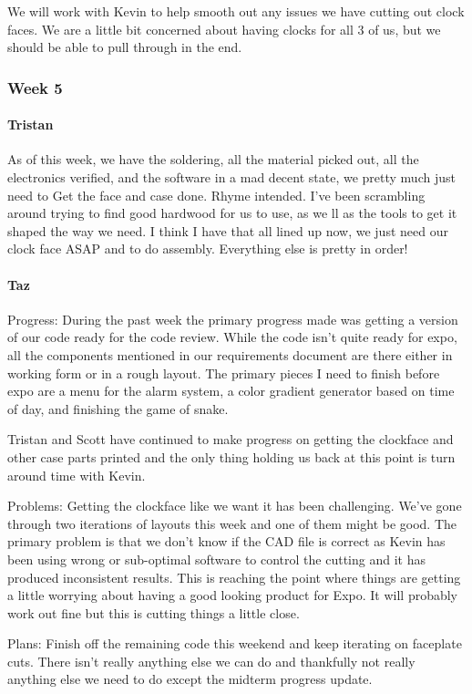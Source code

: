 \documentclass[onecolumn, draftclsnofoot,10pt, compsoc]{IEEEtran}
\begin{document}
We will work with Kevin to help smooth out any issues we have cutting out clock faces. We are a little bit concerned about having clocks for all 3 of us, but we should be able to pull through in the end.
\subsubsection{Week 5}
\paragraph{Tristan}
As of this week, we have the soldering, all the material picked out, all the electronics verified, and the software in a mad decent state, we pretty much just need to Get the face and case done. Rhyme intended. I've been scrambling around trying to find good hardwood for us to use, as we ll as the tools to get it shaped the way we need. I think I have that all lined up now, we just need our clock face ASAP and to do assembly. Everything else is pretty in order!

\paragraph{Taz}
Progress: During the past week the primary progress made was getting a version of our code ready for the code review. While the code isn't quite ready for expo, all the components mentioned in our requirements document are there either in working form or in a rough layout. The primary pieces I need to finish before expo are a menu for the alarm system, a color gradient generator based on time of day, and finishing the game of snake.

Tristan and Scott have continued to make progress on getting the clockface and other case parts printed and the only thing holding us back at this point is turn around time with Kevin.

Problems: Getting the clockface like we want it has been challenging. We've gone through two iterations of layouts this week and one of them might be good. The primary problem is that we don't know if the CAD file is correct as Kevin has been using wrong or sub-optimal software to control the cutting and it has produced inconsistent results. This is reaching the point where things are getting a little worrying about having a good looking product for Expo. It will probably work out fine but this is cutting things a little close.

Plans: Finish off the remaining code this weekend and keep iterating on faceplate cuts. There isn't really anything else we can do and thankfully not really anything else we need to do except the midterm progress update.
\end{document}

